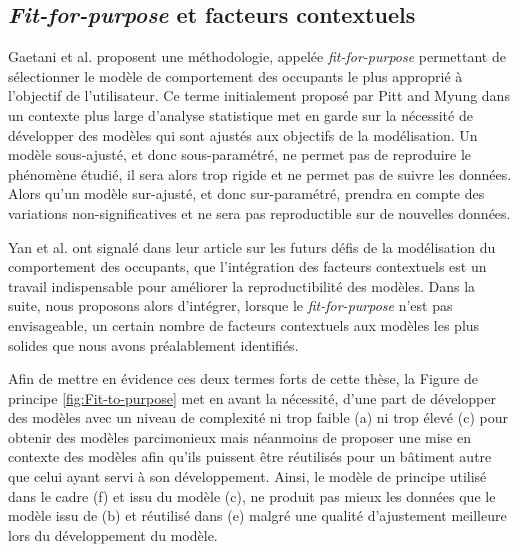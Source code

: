 \subsection{\textit{Fit-for-purpose} et facteurs contextuels}

Gaetani et al. \cite{Gaetani-16} proposent une méthodologie, appelée \textit{fit-for-purpose} permettant de sélectionner le modèle de comportement des occupants le plus approprié à l'objectif de l'utilisateur. Ce terme initialement proposé par Pitt and Myung \cite{Pitt-02} dans un contexte plus large d'analyse statistique met en garde sur la nécessité de développer des modèles qui sont ajustés aux objectifs de la modélisation. Un modèle sous-ajusté, et donc sous-paramétré, ne permet pas de reproduire le phénomène étudié, il sera alors trop rigide et ne permet pas de suivre les données. Alors qu'un modèle sur-ajusté, et donc sur-paramétré, prendra en compte des variations non-significatives et ne sera pas reproductible sur de nouvelles données. 

Yan et al. \cite{Yan-15} ont signalé dans leur article sur les futurs défis de la modélisation du comportement des occupants, que l'intégration des facteurs contextuels est un travail indispensable pour améliorer la reproductibilité des modèles. Dans la suite, nous proposons alors d'intégrer, lorsque le \textit{fit-for-purpose} n'est pas envisageable, un certain nombre de facteurs contextuels aux modèles les plus solides que nous avons préalablement identifiés.

Afin de mettre en évidence ces deux termes forts de cette thèse, la Figure de principe \ref{fig:Fit-to-purpose} met en avant la nécessité, d'une part de développer des modèles avec un niveau de complexité ni trop faible (a) ni trop élevé (c) pour obtenir des modèles parcimonieux mais néanmoins de proposer une mise en contexte des modèles afin qu'ils puissent être réutilisés pour un bâtiment autre que celui ayant servi à son développement. Ainsi, le modèle de principe utilisé dans le cadre (f) et issu du modèle (c), ne produit pas mieux les données que le modèle issu de (b) et réutilisé dans (e) malgré une qualité d'ajustement meilleure lors du développement du modèle.

